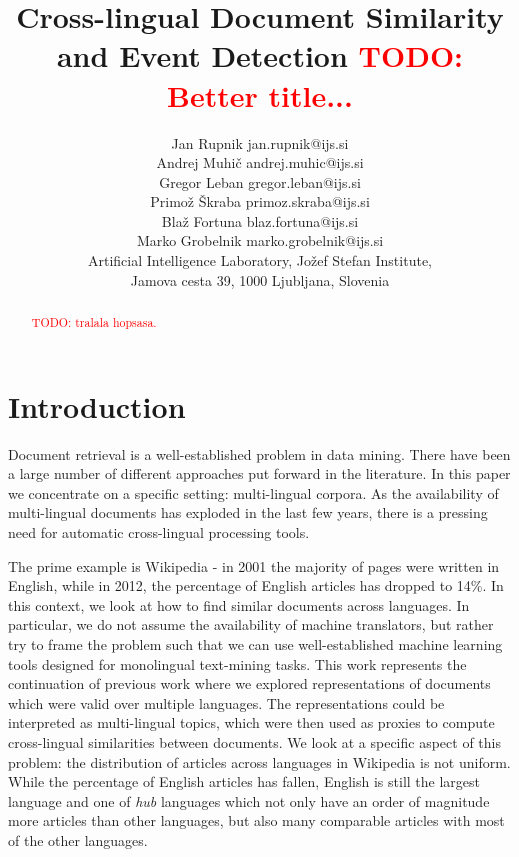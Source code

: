 \documentclass[twoside,11pt]{article}
\newcommand{\todo}[1]{\textcolor{red}{TODO: #1}}
\begin{document}
\title{Cross-lingual Document Similarity and Event Detection \todo{Better title...}}

\author{\name Jan Rupnik \email jan.rupnik@ijs.si \\
       \name Andrej Muhi\v{c} \email andrej.muhic@ijs.si \\
       \name Gregor Leban \email gregor.leban@ijs.si \\
       \name Primo\v{z} \v{S}kraba \email primoz.skraba@ijs.si \\
       \name Bla\v{z} Fortuna \email blaz.fortuna@ijs.si \\
       \name Marko Grobelnik \email marko.grobelnik@ijs.si \\
       \addr Artificial Intelligence Laboratory, Jo\v{z}ef Stefan Institute,\\
       Jamova cesta 39, 1000 Ljubljana, Slovenia}

\maketitle

\begin{abstract}
\todo{tralala hopsasa.}
\end{abstract}

\section{Introduction}

Document retrieval is a well-established problem in data mining. There have been a large number of different approaches put forward in the literature. In this paper we concentrate on a specific setting: multi-lingual corpora. As the availability of multi-lingual documents has exploded in the last few years, there is a pressing need for automatic cross-lingual processing tools.

The prime example is Wikipedia - in 2001 the majority of pages were written in English, while in 2012, the percentage of English articles has dropped to 14\%. In this context, we look at how to find similar documents across languages. In particular, we do not assume the availability of machine translators, but rather try to frame the problem such that we can use well-established machine learning tools designed for monolingual text-mining tasks. This work represents the continuation of previous work \cite{nips, iti, nips2, sikdd} where we explored representations of documents which were valid over multiple languages.  The representations could be interpreted as multi-lingual topics, which were then used as proxies to compute cross-lingual similarities between documents. We look at a specific aspect of this problem: the distribution of articles across languages in Wikipedia is not uniform. While the percentage of English articles has fallen, English is still the largest language and one of \emph{hub} languages which not only have an order of magnitude more articles than other languages, but also many comparable articles with most of the other languages.
\end{document}
